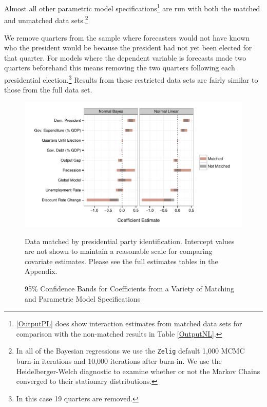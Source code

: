 \documentclass[a4paper]{article}\usepackage{graphicx, color}
\newenvironment{knitrout}{}{} %
\begin{document}
Almost all other parametric model specifications\footnote{\ref{OutputPL} does show interaction estimates from matched data sets for comparison with the non-matched results in Table \ref{OutputNL}.} are run with both the matched and unmatched data sets.\footnote{In all of the Bayesian regressions we use the {\tt{Zelig}} default 1,000 MCMC burn-in iterations and 10,000 iterations after burn-in. We use the Heidelberger-Welch diagnostic to examine whether or not the Markov Chains converged to their stationary distributions.}

We remove quarters from the sample where forecasters would not have known who the president would be because the president had not yet been elected for that quarter. For models where the dependent variable is forecasts made two quarters beforehand this means removing the two quarters following each presidential election.\footnote{In this case 19 quarters are removed.} Results from these restricted data sets are fairly similar to those from the full data set.




\begin{figure}[t]
    \caption{95\% Confidence Bands for Coefficients from a Variety of Matching and Parametric Model Specifications}
    \label{CoefComparePlots}
    \begin{center}

\begin{knitrout}
\color{fgcolor}

{\centering \includegraphics[width=0.95\linewidth]{figure/CoefComparePlots} 

}



\end{knitrout}

    \end{center}
    \begin{singlespace}
        {\scriptsize{Data matched by presidential party identification. Intercept values are not shown to maintain a reasonable scale for comparing covariate estimates. Please see the full estimates tables in the Appendix.}}
    \end{singlespace}
\end{figure}
\end{document}
